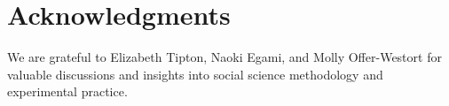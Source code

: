 \section*{Acknowledgments}
\label{sec:acknowledgements}

We are grateful to Elizabeth Tipton, Naoki Egami, and Molly Offer-Westort for valuable discussions and insights into social science methodology and experimental practice.
